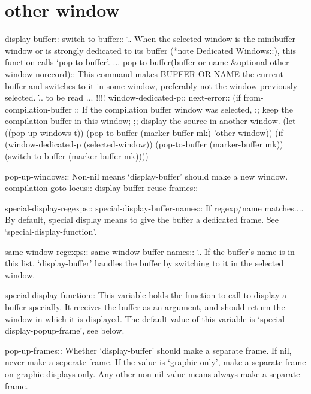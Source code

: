 \documentclass[a4paper]{report}
\begin{document}
\section{other window}

display-buffer::
switch-to-buffer::
\... When the selected window is the minibuffer window or is strongly
dedicated to its buffer (*note Dedicated Windows::), this function calls
`pop-to-buffer'. ...
pop-to-buffer(buffer-or-name &optional other-window norecord)::
This command makes BUFFER-OR-NAME the current buffer and switches
to it in some window, preferably not the window previously
selected. 
\... to be read ... !!!!
window-dedicated-p::
next-error::
(if from-compilation-buffer
        ;; If the compilation buffer window was selected,
        ;; keep the compilation buffer in this window;
        ;; display the source in another window.
        (let ((pop-up-windows t))
          (pop-to-buffer (marker-buffer mk) 'other-window))
      (if (window-dedicated-p (selected-window))
          (pop-to-buffer (marker-buffer mk))
        (switch-to-buffer (marker-buffer mk))))




pop-up-windows::
  Non-nil means `display-buffer' should make a new window.
compilation-goto-locus::
display-buffer-reuse-frames::

special-display-regexps::
special-display-buffer-names::
If regexp/name matches.... By default, special display means to give the
buffer a dedicated frame. See `special-display-function'.

same-window-regexps::
same-window-buffer-names::
\... If the buffer's name is in this list, `display-buffer' handles the buffer by
switching to it in the selected window.

special-display-function::
This variable holds the function to call to display a buffer
specially.  It receives the buffer as an argument, and should
return the window in which it is displayed.  The default value of
this variable is `special-display-popup-frame', see below.


pop-up-frames::
Whether `display-buffer' should make a separate frame.
If nil, never make a seperate frame.
If the value is `graphic-only', make a separate frame
on graphic displays only.
Any other non-nil value means always make a separate frame.
  
\end{document}
